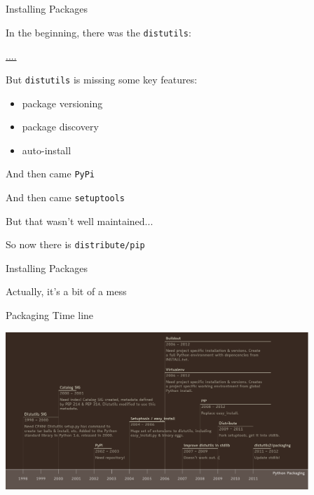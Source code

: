 \documentclass{beamer}
\begin{document}
\begin{frame}[fragile]{Installing Packages}

{\Large In the beginning, there was the \verb|distutils|:}

\url{....}

{\Large But \verb|distutils| is missing some key features:}
\begin{itemize}
  \item package versioning
  \item package discovery
  \item auto-install
\end{itemize}

\vfill
{\Large And then came \verb|PyPi|}

\vfill
{\Large And then came \verb|setuptools|}

\vfill
{\Large But that wasn't well maintained...}

\vfill
{\Large So now there is \verb|distribute/pip|}

\end{frame} 

\begin{frame}[fragile]{Installing Packages}

\vfill
{\LARGE Actually, it's a bit of a mess}
\vfill

\end{frame} 

\begin{frame}[fragile]{Packaging Time line}

{\centering
\includegraphics[width=4.5in]{PackagingTimeline.pdf}
}
\end{frame} 
\end{document}
